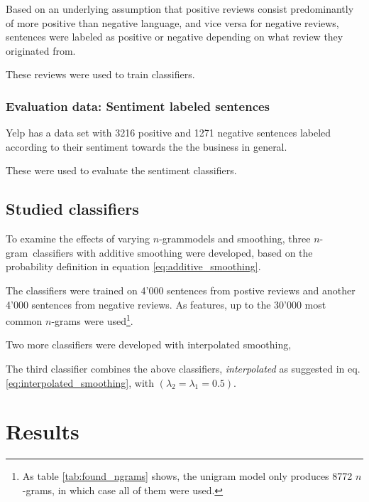 \documentclass[a4paper,11pt]{kth-mag}
\newcommand{\ngram}{$n$-gram}
\begin{document}
Based on an underlying assumption that positive reviews consist predominantly of more
positive than negative language, and vice versa for negative reviews,
sentences were labeled as positive or negative depending on what review they originated from.

These reviews were used to train classifiers.

\subsubsection{Evaluation data: Sentiment labeled sentences}
Yelp has a data set with 3216 positive and 1271 negative sentences labeled
according to their sentiment towards the the business in general.

These were used to evaluate the sentiment classifiers.

\subsection{Studied classifiers}
To examine the effects of varying \ngram models and smoothing,
three \ngram~classifiers with additive smoothing were developed, based on the
probability definition in equation \ref{eq:additive_smoothing}.

The classifiers were trained on 4'000 sentences from postive reviews
and another 4'000 sentences from negative reviews.
As features, up to the 30'000 most common \ngram s were used\footnote{As table
  \ref{tab:found_ngrams} shows, the unigram model only produces 8772 \ngram s,
  in which case all of them were used.}.


Two more classifiers were developed with interpolated smoothing, 

The third classifier combines the above classifiers,
\emph{interpolated} as suggested in eq. \ref{eq:interpolated_smoothing}, with
$(\lambda_2=\lambda_1=0.5)$.



\newpage
\section{Results}
\end{document}
